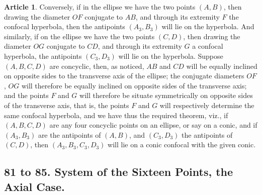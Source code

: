 \documentclass[11pt,a4paper]{article}
\theoremstyle{definition}
\newtheorem{art}{Article}
\begin{document}
\begin{art}
Conversely, if in the ellipse we have the two points $(A, B)$, then drawing the diameter $OF$ conjugate to $AB$, and through its extremity $F$ the confocal hyperbola, then the antipoints $(A_{3}, B_{3})$ will lie on the hyperbola. And similarly, if on the ellipse we have the two points $(C, D)$, then drawing the diameter $OG$ conjugate to $CD$, and through its extremity $G$ a confocal hyperbola, the antipoints $(C_{3}, D_{3})$ will lie on the hyperbola. Suppose $(A, B, C, D)$ are concyclic, then, as noticed, $AB$ and $CD$ will be equally inclined on opposite sides to the transverse axis of the ellipse; the conjugate diameters $OF$, $OG$ will therefore be equally inclined on opposite sides of the transverse axis; and the points $F$ and $G$ will therefore be situate symmetrically on opposite sides of the transverse axis, that is, the points $F$ and $G$ will respectively determine the same confocal hyperbola, and we have thus the required theorem, viz., if $(A, B, C, D)$ are any four concyclic points on an ellipse, or say on a conic, and if $(A_{3}, B_{3})$ are the antipoints of $(A, B)$, and $(C_{3}, D_{3})$ the antipoints of $(C, D)$, then $(A_{3}, B_{3}, C_{3}, D_{3})$ will lie on a conic confocal with the given conic.
\end{art}

\subsection{81 to 85. System of the Sixteen Points, the Axial Case.}
\end{document}
